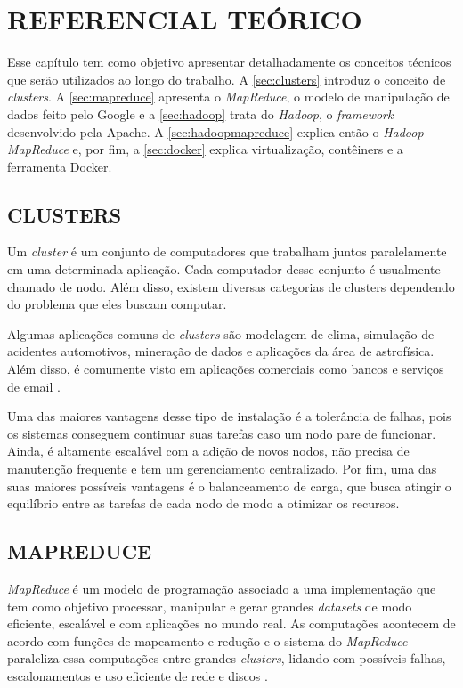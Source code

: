 \chapter{REFERENCIAL TEÓRICO} \label{cha:refteorico}

Esse capítulo tem como objetivo apresentar detalhadamente os conceitos técnicos que serão utilizados ao longo do trabalho. A \autoref{sec:clusters} introduz o conceito de \textit{clusters}. A \autoref{sec:mapreduce} apresenta o \textit{MapReduce}, o modelo de manipulação de dados feito pelo Google e a \autoref{sec:hadoop} trata do \textit{Hadoop}, o \textit{framework} desenvolvido pela Apache. A \autoref{sec:hadoopmapreduce} explica então o \textit{Hadoop MapReduce} e, por fim, a \autoref{sec:docker} explica virtualização, contêiners e a ferramenta Docker.

\section{CLUSTERS} \label{sec:clusters}

Um \textit{cluster} é um conjunto de computadores que trabalham juntos paralelamente em uma determinada aplicação. Cada computador desse conjunto é usualmente chamado de nodo. Além disso, existem diversas categorias de clusters dependendo do problema que eles buscam computar.

Algumas aplicações comuns de \textit{clusters} são modelagem de clima, simulação de acidentes automotivos, mineração de dados e aplicações da área de astrofísica. Além disso, é comumente visto em aplicações comerciais como bancos e serviços de email \cite{ClusterGridCloudComparison11}.

Uma das maiores vantagens desse tipo de instalação é a tolerância de falhas, pois os sistemas conseguem continuar suas tarefas caso um nodo pare de funcionar. Ainda, é altamente escalável com a adição de novos nodos, não precisa de manutenção frequente e tem um gerenciamento centralizado. Por fim, uma das suas maiores possíveis vantagens é o balanceamento de carga, que busca atingir o equilíbrio entre as tarefas de cada nodo de modo a otimizar os recursos.

\section{MAPREDUCE} \label{sec:mapreduce}

\textit{MapReduce} é um modelo de programação associado a uma implementação que tem como objetivo processar, manipular e gerar grandes \textit{datasets} de modo eficiente, escalável e com aplicações no mundo real. As computações acontecem de acordo com funções de mapeamento e redução e o sistema do \textit{MapReduce} paraleliza essa computações entre grandes \textit{clusters}, lidando com possíveis falhas, escalonamentos e uso eficiente de rede e discos \cite{MapReduce08}.

